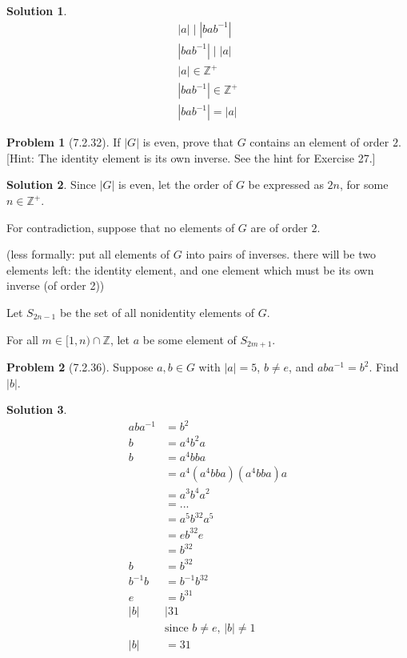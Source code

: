\documentclass[12pt]{article}
\theoremstyle{definition}
\newtheorem*{prob}{Problem}
\newtheorem*{soln}{Solution}
\newcommand{\ZZ}{{\mathbb{Z}}}
\begin{document}
\begin{soln}
\begin{gather*}
\left|a\right| \mid \left|bab^{-1}\right|\\
\left|bab^{-1}\right|\mid \left|a\right|\\
\left|a\right|\in \ZZ^+\\
\left|bab^{-1}\right| \in\ZZ^+\\
\left|bab^{-1}\right|=\left|a\right|
\end{gather*}

\end{soln}

\begin{prob}[7.2.32]
If  $|G|$ is even, prove that $G$ contains an element of  order $2$. 
[Hint: The identity element is its own inverse. See the hint for Exercise 27.]
\end{prob}

\begin{soln}\quad

Since $|G|$ is even,
let the order of $G$ be expressed as $2n$, for some $n\in\ZZ^+$.

For contradiction, suppose that no elements of $G$ are of order $2$.

(less formally: put all elements of $G$ into pairs of inverses.
there will be two elements left: the identity element,
and one element which must be its own inverse (of order 2))

Let $S_{2n-1}$ be the set of all nonidentity elements of $G$.

For all $m\in[1,n)\cap\ZZ$, let $a$ be some element of $S_{2m+1}$.

\end{soln}

\begin{prob}[7.2.36]
Suppose $a, b\in G$ with $|a| = 5$, $b \neq e$, and $aba^{-1} = b^2$. 
Find $|b|$.
\end{prob}

\begin{soln}

\begin{align*}
aba^{-1}&=b^2\\
b&=a^4b^2a\\
b&=a^4bba\\
&=a^4(a^4bba)(a^4bba)a\\
&=a^3b^4a^2\\
&=...\\
&=a^5b^{32}a^5\\
&=eb^{32}e\\
&=b^{32}\\
b&=b^{32}\\
b^{-1}b&=b^{-1}b^{32}\\
e&=b^{31}\\
|b|&\mid 31\\
&\text{since $b\neq e$, $|b|\neq 1$}\\
|b|&=31
\end{align*}

\end{soln}
\end{document}
